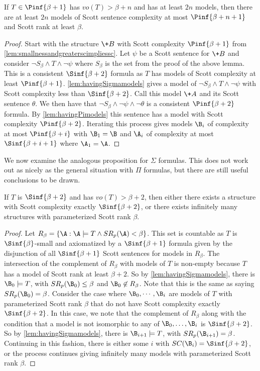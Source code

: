 \documentclass{amsart}
\renewcommand{\-}{\text{-}}
\begin{document}
\begin{lemma}
If $T\in \Pinf{\beta+1}$ has $vo(T)>\beta+n$ and has at least $2n$ models, then there are at least $2n$ models of Scott sentence complexity at most $\Pinf{\beta+n+1}$ and Scott rank at least $\beta$.
\end{lemma}
\begin{proof}
  Start with the structure $\+B$ with Scott complexity $\Pinf{\beta+1}$ from \cref{lem:smallnessandgreaterscimpliessc}. Let $\psi$ be a Scott sentence for $\+B$ and consider $\neg S_\beta\land T\land \neg \psi$ where $S_\beta$ is the set from the proof of the above lemma. This is a consistent $\Sinf{\beta+2}$ formula as $T$ has models of Scott complexity at least $\Pinf{\beta+1}$. \cref{lem:havingSigmamodels} gives a model of $\neg S_\beta\land T\land \neg \psi$ with Scott complexity less than $\Sinf{\beta+2}$. Call this model $\+A$ and its Scott sentence $\theta$. We then have that $\neg S_\beta\land \neg \psi\land \neg \theta$ is a consistent $\Pinf{\beta+2}$ formula. By \cref{lem:havingPimodels} this sentence has a model with Scott complexity $\Pinf{\beta+2}$. Iterating this process gives models $\B_i$ of complexity at most $\Pinf{\beta+i}$ with $\B_1=\B$ and $\A_i$ of complexity at most $\Sinf{\beta+i+1}$ where $\A_1=\A$. 
  \end{proof}

We now examine the analogous proposition for $\Sigma$ formulas.
This does not work out as nicely as the general situation with $\Pi$ formulas, but there are still useful conclusions to be drawn.
    
\begin{proposition}\label{prop:sigmasmallnessandgreaterscimpliessc}
If $T$ is $\Sinf{\beta+2}$ and has $vo(T)>\beta+2$, then either there exists a structure with Scott complexity exactly $\Sinf{\beta+2}$, or there exists infinitely many structures with parameterized Scott rank $\beta$.
\end{proposition}

\begin{proof}
Let $R_{\beta}=\{\A : \A\models T \land SR_p(\A)<\beta\}$. This set is countable as $T$ is $\Sinf{\beta}$-small and axiomatized by a $\Sinf{\beta+1}$ formula given by the disjunction of all $\Sinf{\beta+1}$ Scott sentences for models in $R_\beta$. The intersection of the complement of $R_\beta$ with models of $T$ is non-empty because $T$ has a model of Scott rank at least $\beta+2$. So by \cref{lem:havingSigmamodels}, there is $\B_0\models T$, with $SR_p(\B_0)\leq\beta$ and $\B_0\not\in R_\beta$. Note that this is the same as saying $SR_p(\B_0)=\beta$.  Consider the case where $\B_0,\cdots,\B_i$ are models of $T$ with parameterized Scott rank $\beta$ that do not have Scott complexity exactly $\Sinf{\beta+2}$. In this case, we note that the complement of $R_\beta$ along with the condition that a model is not isomorphic to any of $\B_0,\dots,\B_i$ is $\Sinf{\beta+2}$. So by \cref{lem:havingSigmamodels}, there is $\B_{i+1}\models T$, with $SR_p(\B_{i+1})=\beta$. Continuing in this fashion, there is either some $i$ with $SC(\B_{i})=\Sinf{\beta+2}$, or the process continues giving infinitely many models with parameterized Scott rank $\beta$.
\end{proof}
\end{document}
